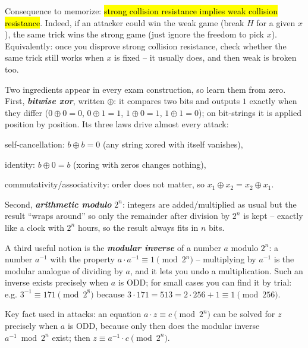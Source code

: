 \documentclass[12pt, a4paper]{article}
\newcommand{\term}[1]{\textbf{\textit{#1}}}        %
\newcommand{\imp}[1]{\hl{#1}}                       %
\begin{document}
Consequence to memorize: \imp{strong collision resistance implies weak collision resistance}. Indeed, if an attacker could win the weak game (break $H$ for a given $x$), the same trick wins the strong game (just ignore the freedom to pick $x$).
Equivalently: once you disprove strong collision resistance, check whether the same trick still works when $x$ is fixed -- it usually does, and then weak is broken too.

Two ingredients appear in every exam construction, so learn them from zero. First, \term{bitwise xor}, written $\oplus$: it compares two bits and outputs $1$ exactly when they differ ($0 \oplus 0 = 0$, $0 \oplus 1 = 1$, $1 \oplus 0 = 1$, $1 \oplus 1 = 0$); on bit-strings it is applied position by position. Its three laws drive almost every attack:
\begin{tightitem}
    \item self-cancellation: $b \oplus b = 0$ (any string xored with itself vanishes),
    \item identity: $b \oplus 0 = b$ (xoring with zeros changes nothing),
    \item commutativity/associativity: order does not matter, so $x_1 \oplus x_2 = x_2 \oplus x_1$.
\end{tightitem}
Second, \term{arithmetic modulo} $2^{n}$: integers are added/multiplied as usual but the result ``wraps around'' so only the remainder after division by $2^{n}$ is kept -- exactly like a clock with $2^{n}$ hours, so the result always fits in $n$ bits.

A third useful notion is the \term{modular inverse} of a number $a$ modulo $2^{n}$: a number $a^{-1}$ with the property $a \cdot a^{-1} \equiv 1 \pmod{2^{n}}$ -- multiplying by $a^{-1}$ is the modular analogue of dividing by $a$, and it lets you undo a multiplication.
Such an inverse exists precisely when $a$ is ODD; for small cases you can find it by trial: e.g. $3^{-1} \equiv 171 \pmod{2^{8}}$ because $3 \cdot 171 = 513 = 2 \cdot 256 + 1 \equiv 1 \pmod{256}$.

Key fact used in attacks: an equation $a \cdot z \equiv c \pmod{2^{n}}$ can be solved for $z$ precisely when $a$ is ODD, because only then does the modular inverse $a^{-1} \bmod 2^{n}$ exist; then $z \equiv a^{-1} \cdot c \pmod{2^{n}}$.
\end{document}
